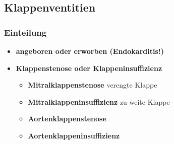 	\subsection{Klappenventitien}
		\subsubsection{Einteilung}
			\begin{itemize}
				\item \textbf{angeboren oder erworben (Endokarditis!)}
				\item \textbf{Klappenstenose oder Klappeninsuffizienz}
					\begin{itemize}
						\item \textbf{Mitralklappenstenose} verengte Klappe
						\item \textbf{Mitralklappeninsuffizienz} zu weite Klappe
						\item \textbf{Aortenklappenstenose}
						\item \textbf{Aortenklappeninsuffizienz} 
					\end{itemize}
			\end{itemize}